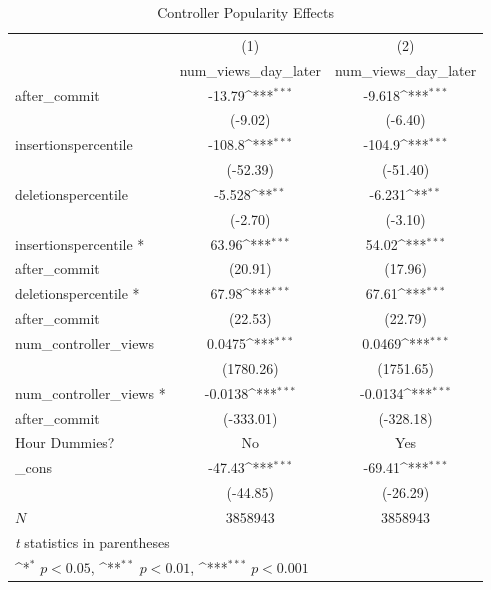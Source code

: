 \documentclass[10pt]{article}
\begin{document}
\begin{table}[h!]
\centering
\caption{Controller Popularity Effects}
{
    \def\sym#1{\ifmmode^{#1}\else\(^{#1}\)\fi}
    \begin{tabular}{l*{2}{c}}
    \hline\hline
        &\multicolumn{1}{c}{(1)}&\multicolumn{1}{c}{(2)}\\
        &\multicolumn{1}{c}{num\_views\_day\_later}&\multicolumn{1}{c}{num\_views\_day\_later}\\
        \hline
        after\_commit&      -13.79\sym{***}&      -9.618\sym{***}\\
        &     (-9.02)         &     (-6.40)         \\
        [0.5em]
        insertionspercentile&      -108.8\sym{***}&      -104.9\sym{***}\\
        &    (-52.39)         &    (-51.40)         \\
        [0.5em]
        deletionspercentile&      -5.528\sym{**} &      -6.231\sym{**} \\
        &     (-2.70)         &     (-3.10)         \\
        [0.5em]
        insertionspercentile *&       63.96\sym{***}&       54.02\sym{***}\\
        after\_commit &     (20.91)         &     (17.96)         \\
        [0.5em]
        deletionspercentile *&       67.98\sym{***}&       67.61\sym{***}\\
        after\_commit&     (22.53)         &     (22.79)         \\
        [0.5em]
        num\_controller\_views&      0.0475\sym{***}&      0.0469\sym{***}\\
        &   (1780.26)         &   (1751.65)         \\
        [0.5em]
        num\_controller\_views *&     -0.0138\sym{***}&     -0.0134\sym{***}\\
        after\_commit&   (-333.01)         &   (-328.18)         \\
        [0.5em]
        Hour Dummies?  &      No               &    Yes        \\
        [0.5em]
        \_cons      &      -47.43\sym{***}&      -69.41\sym{***}\\
        &    (-44.85)         &    (-26.29)         \\
        \hline
        \(N\)       &     3858943         &     3858943         \\
        \hline\hline
        \multicolumn{3}{l}{\footnotesize \textit{t} statistics in parentheses}\\
        \multicolumn{3}{l}{\footnotesize \sym{*} \(p<0.05\), \sym{**} \(p<0.01\), \sym{***} \(p<0.001\)}\\
        \end{tabular}
}
\label{table:full-controller-micro}
\end{table}
\end{document}
